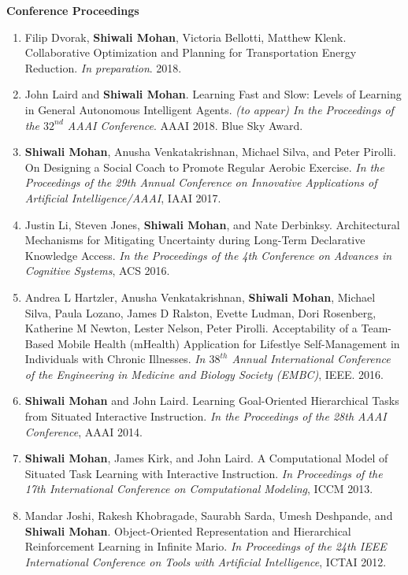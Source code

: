 \documentclass[margin,line,11pt]{res}
\begin{document}
\begin{resume}
\textbf{Conference Proceedings}
\begin{enumerate}[label=\lbrack C\arabic*\rbrack,leftmargin=*]
  \item Filip Dvorak, \textbf{Shiwali Mohan}, Victoria Bellotti, Matthew Klenk. Collaborative Optimization and Planning for Transportation Energy Reduction. \emph{In preparation}. 2018.
  \item John Laird and \textbf{Shiwali Mohan}. Learning Fast and Slow: Levels of Learning in General Autonomous Intelligent Agents. \emph{(to appear) In the Proceedings of the $32^{nd}$ AAAI Conference}. AAAI 2018. Blue Sky Award.
  \item \textbf{Shiwali Mohan}, Anusha Venkatakrishnan, Michael Silva, and Peter Pirolli. On Designing a Social Coach to Promote Regular Aerobic Exercise. \emph{In the Proceedings of the 29th Annual Conference on Innovative Applications of Artificial Intelligence/AAAI}, IAAI 2017.
  \item Justin Li, Steven Jones, \textbf{Shiwali Mohan}, and Nate Derbinksy. Architectural Mechanisms for Mitigating Uncertainty during Long-Term Declarative Knowledge Access. \emph{In the Proceedings of the 4th Conference on Advances in Cognitive Systems}, ACS 2016.
  \item Andrea L Hartzler, Anusha Venkatakrishnan, \textbf{Shiwali Mohan}, Michael Silva, Paula Lozano, James D Ralston, Evette Ludman, Dori Rosenberg, Katherine M Newton, Lester Nelson, Peter Pirolli. Acceptability of a Team-Based Mobile Health (mHealth) Application for Lifestlye Self-Management in Individuals with Chronic Illnesses. \emph{In $38^{th}$ Annual International Conference of the Engineering in Medicine and Biology Society (EMBC)}, IEEE. 2016.
  \item \textbf{Shiwali Mohan} and John Laird. Learning Goal-Oriented Hierarchical Tasks from Situated Interactive Instruction. \emph{In the Proceedings of the 28th AAAI Conference}, AAAI 2014.
  \item \textbf{Shiwali Mohan}, James Kirk, and John Laird. A Computational Model of Situated Task Learning with Interactive Instruction. \emph{In Proceedings of the 17th International Conference on Computational Modeling}, ICCM 2013.
  \item Mandar Joshi, Rakesh Khobragade, Saurabh Sarda, Umesh Deshpande, and \textbf{Shiwali Mohan}. Object-Oriented Representation and Hierarchical Reinforcement Learning in Infinite Mario. \emph{In Proceedings of the 24th IEEE International Conference on Tools with Artificial Intelligence}, ICTAI 2012.

\end{enumerate}
\end{resume}
\end{document}
